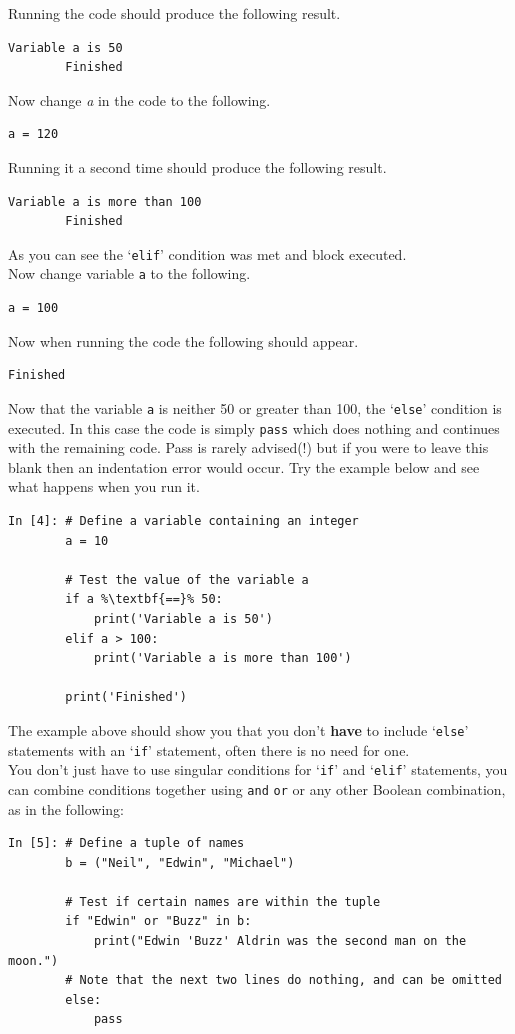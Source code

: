 \noindent Running the code should produce the following result.
\begin{lstlisting}[style=PY_out]
        Variable a is 50
        Finished
\end{lstlisting}  
Now change {\it a} in the code to the following.
\begin{lstlisting}[style=PY]
        a = 120
\end{lstlisting}
\noindent Running it a second time should produce the following result.
\begin{lstlisting}[style=PY_out]
        Variable a is more than 100
        Finished
\end{lstlisting}  
\noindent As you can see the `{\tt elif}' condition was met and block executed.\\
\noindent Now change variable {\tt a} to the following.
\begin{lstlisting}[style=PY]
        a = 100
\end{lstlisting}
\noindent Now when running the code the following should appear.
\begin{lstlisting}[style=PY_out]
        Finished
\end{lstlisting}  
\noindent Now that the variable \texttt{a} is neither 50 or greater than 100, the `{\tt else}' condition is executed. In this case the code is simply \texttt{\color{mygreen}pass} which does nothing and continues with the remaining code. Pass is rarely advised(!) but if you were to leave this blank then an indentation error would occur. Try the example below and see what happens when you run it.
\begin{lstlisting}[style=PY, escapechar=\%]
In [4]: # Define a variable containing an integer 
        a = 10
        
        # Test the value of the variable a
        if a %\textbf{==}% 50:
            print('Variable a is 50')
        elif a > 100:
            print('Variable a is more than 100')

        print('Finished')
\end{lstlisting}
\noindent The example above should show you that you don't \textbf{have} to include `{\tt else}' statements with an `{\tt if}' statement, often there is no need for one. \\
You don't just have to use singular conditions for `{\tt if}' and `{\tt elif}' statements, you can combine conditions together using \texttt{and} \texttt{or} or any other Boolean combination, as in the following:
\begin{lstlisting}[style=PY]
In [5]: # Define a tuple of names 
        b = ("Neil", "Edwin", "Michael")
        
        # Test if certain names are within the tuple
        if "Edwin" or "Buzz" in b:
            print("Edwin 'Buzz' Aldrin was the second man on the moon.")
        # Note that the next two lines do nothing, and can be omitted
        else:
            pass
\end{lstlisting}
